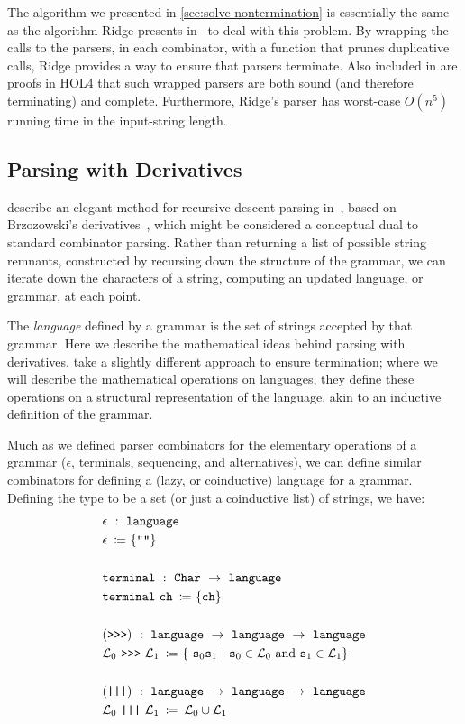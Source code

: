       The algorithm we presented in \autoref{sec:solve-nontermination} is essentially the same as the algorithm Ridge presents in~\cite{Ridge} to deal with this problem.  By wrapping the calls to the parsers, in each combinator, with a function that prunes duplicative calls, Ridge provides a way to ensure that parsers terminate.  Also included in \cite{Ridge} are proofs in HOL4 that such wrapped parsers are both sound (and therefore terminating) and complete.  Furthermore, Ridge's parser has worst-case $O(n^5)$ running time in the input-string length.

  \subsection{Parsing with Derivatives}
     describe an elegant method for recursive-descent parsing in~\cite{Derivs}, based on Brzozowski's derivatives~\cite{BrzozowskiDerivs}, which might be considered a conceptual dual to standard combinator parsing.  Rather than returning a list of possible string remnants, constructed by recursing down the structure of the grammar, we can iterate down the characters of a string, computing an updated language, or grammar, at each point.
    
    The \emph{language} defined by a grammar is the set of strings accepted by that grammar.  Here we describe the mathematical ideas behind parsing with derivatives.  \citeauthor*{Derivs} take a slightly different approach to ensure termination; where we will describe the mathematical operations on languages, they define these operations on a structural representation of the language, akin to an inductive definition of the grammar.
    
    Much as we defined parser combinators for the elementary operations of a grammar ($\epsilon$, terminals, sequencing, and alternatives), we can define similar combinators for defining a (lazy, or coinductive) language for a grammar.  Defining the type  to be a set (or just a coinductive list) of strings, we have:
\begin{align*}
& \epsilon~:~\texttt{language} \\
& \epsilon ~\operatorname{\texttt{\ensuremath{\coloneqq}}}~ \{\texttt{"}\texttt{}\texttt{"}\} \\ \\
& \texttt{terminal}~:~\texttt{Char}~\to~\texttt{language} \\
& \texttt{terminal}~\texttt{ch} ~\operatorname{\texttt{\ensuremath{\coloneqq}}}~ \{\texttt{ch}\} \\ \\
& (\texttt{\texttt{>{}>{}>}})~:~\texttt{language}~\to~\texttt{language}~\to~\texttt{language} \\
& \mathcal{L}_0~\texttt{\texttt{>{}>{}>}}~\mathcal{L}_1 ~\operatorname{\texttt{\ensuremath{\coloneqq}}}~ \{~\texttt{s\ensuremath{_0}}\texttt{s\ensuremath{_1}}~|~\texttt{s\ensuremath{_0}}\in\mathcal L_0\text{ and }\texttt{s\ensuremath{_1}}\in\mathcal{L}_1 \} \\ \\
& (\texttt{|||})~:~\texttt{language}~\to~\texttt{language}~\to~\texttt{language} \\
& \mathcal{L}_0~\texttt{|||}~\mathcal{L}_1 ~\operatorname{\texttt{\ensuremath{\coloneqq}}}~ \mathcal L_0\cup\mathcal L_1
\end{align*}

